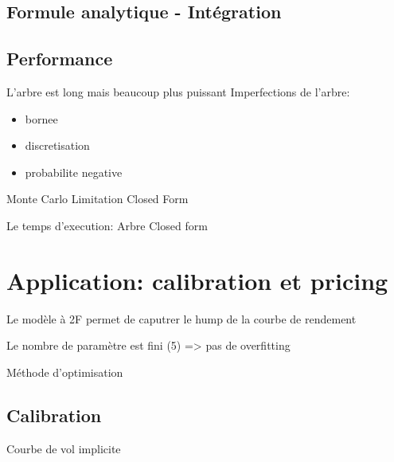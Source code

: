 \documentclass[paper=a4, fontsize=11pt]{scrartcl}
\numberwithin{equation}{section}		%
\numberwithin{figure}{section}			%
\numberwithin{table}{section}				%
\begin{document}
\subsection{Formule analytique - Intégration}

\subsection{Performance}
L'arbre est long mais beaucoup plus puissant
Imperfections de l'arbre:
\begin{itemize}
\item  bornee
\item  discretisation
\item  probabilite negative
\end{itemize}
Monte Carlo
Limitation
Closed Form

Le temps d'execution:
Arbre
Closed form

\newpage
\section{Application: calibration et pricing}
Le modèle à 2F permet de caputrer le hump de la courbe de rendement

Le nombre de paramètre est fini (5) => pas de overfitting

Méthode d'optimisation


\subsection{Calibration}
Courbe de vol implicite
\end{document}
